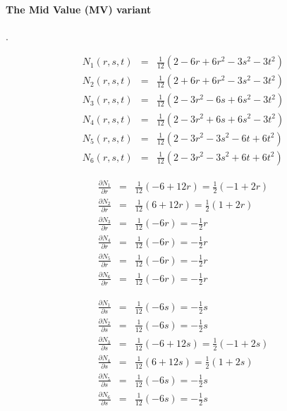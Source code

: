 \paragraph{The Mid Value (MV) variant}. 

\begin{eqnarray}
N_1(r,s,t) &=& \frac{1}{12}(2-6r+6r^2-3s^2-3t^2) \\
N_2(r,s,t) &=& \frac{1}{12}(2+6r+6r^2-3s^2-3t^2) \\
N_3(r,s,t) &=& \frac{1}{12}(2-3r^2-6s+6s^2-3t^2) \\
N_4(r,s,t) &=& \frac{1}{12}(2-3r^2+6s+6s^2-3t^2) \\
N_5(r,s,t) &=& \frac{1}{12}(2-3r^2-3s^2-6t+6t^2) \\
N_6(r,s,t) &=& \frac{1}{12}(2-3r^2-3s^2+6t+6t^2)
\end{eqnarray}

\begin{eqnarray}
\frac{\partial N_1}{\partial r} &=& \frac{1}{12}(-6+12r) = \frac{1}{2}(-1+2r)\\
\frac{\partial N_2}{\partial r} &=& \frac{1}{12}(6+12r) = \frac{1}{2}(1+2r)\\
\frac{\partial N_3}{\partial r} &=& \frac{1}{12}(-6r) = -\frac{1}{2}r \\
\frac{\partial N_4}{\partial r} &=& \frac{1}{12}(-6r) = -\frac{1}{2}r \\
\frac{\partial N_5}{\partial r} &=& \frac{1}{12}(-6r) = -\frac{1}{2}r \\
\frac{\partial N_6}{\partial r} &=& \frac{1}{12}(-6r) = -\frac{1}{2}r 
\end{eqnarray}

\begin{eqnarray}
\frac{\partial N_1}{\partial s} &=& \frac{1}{12} (-6s) = -\frac{1}{2}s \\
\frac{\partial N_2}{\partial s} &=& \frac{1}{12} (-6s) = -\frac{1}{2}s \\
\frac{\partial N_3}{\partial s} &=& \frac{1}{12} (-6+12s) = \frac{1}{2} (-1+2s) \\ 
\frac{\partial N_4}{\partial s} &=& \frac{1}{12} (6+12s) = \frac{1}{2} (1+2s) \\ 
\frac{\partial N_5}{\partial s} &=& \frac{1}{12} (-6s) = -\frac{1}{2}s \\
\frac{\partial N_6}{\partial s} &=& \frac{1}{12} (-6s) = -\frac{1}{2}s 
\end{eqnarray}

